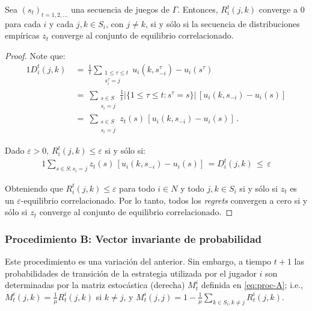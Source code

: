 \begin{proposition}
\label{prop:no-regret}
Sea $(s_t)_{t = 1, 2, ...}$ una secuencia de juegos de $\Gamma$.
Entonces, $R_i^t(j, k)$ converge a $0$ para cada $i$ y cada $j, k \in S_i$, con $j \neq k$, si y sólo si la secuencia de distribuciones empíricas $z_t$ converge al conjunto de equilibrio correlacionado.
\end{proposition}

\begin{proof}
Note que:
\begin{alignat}{1}
  D_i^t(j, k)\ 
    &=\ \frac{1}{t} \sum_{\substack{1\leq \tau \leq t \\ s_i^{\tau}=j}} u_i(k, s_{-i}^{\tau}) - u_i(s^{\tau}) \\
    &=\ \sum_{ \substack{s \in S \\ s_i = j}} \frac{1}{t} |\{1\leq\tau \leq t : s^{\tau} = s\}|\,[u_i(k, s_{-i}) - u_i(s)] \\
    &=\ \sum_{ \substack{s \in S \\ s_i = j}} z_t(s)\,[u_i(k, s_{-i}) - u_i(s)] \,.
\end{alignat}

Dado $\varepsilon > 0$, $R_i^t(j, k) \leq \varepsilon$ si y sólo si:
\begin{alignat}{1}
    \sum_{s \in S : s_i = j} z_t(s)\,[u_i(k, s_{-i}) - u_i(s)] \, = D_i^t(j, k) \, \leq \, \varepsilon
\end{alignat}

Obteniendo que $R_i^t(j, k) \leq \varepsilon$ para todo $i \in N$ y todo $j, k \in S_i$ si y sólo si $z_t$ es un $\varepsilon$-equilibrio correlacionado. Por lo tanto, todos los \textit{regrets} convergen a cero si y sólo si $z_t$ converge al conjunto de equilibrio correlacionado.

\end{proof}

\subsubsection{Procedimiento B: Vector invariante de probabilidad}

Este procedimiento es una variación del anterior. Sin embargo, a tiempo $t+1$ las probabilidades de transición de la estrategia utilizada por el jugador $i$ son determinadas por la matriz estocástica (derecha) $M^i_t$ definida en \eqref{eq:proc-A}; i.e., $M^i_t(j,k)=\frac{1}{\mu}R^i_t(j,k)$ si $k\neq j$, y $M^i_t(j,j)=1-\frac{1}{\mu}\sum_{k\in S_i,k\neq j} R^i_t(j,k)$.

